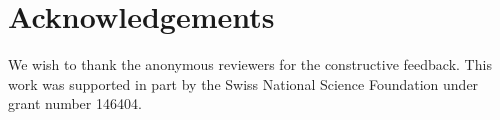 \section*{Acknowledgements}
We wish to thank the anonymous reviewers for the constructive feedback.
This work was supported in part by the Swiss National Science Foundation under grant number 146404.